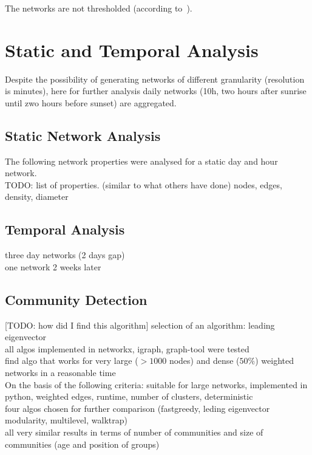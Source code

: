 The networks are not thresholded (according to~\cite{farine2015constructing}).

\section{Static and Temporal Analysis}

Despite the possibility of generating networks of different granularity (resolution is minutes), here for further analysis daily networks (10h, two hours after sunrise until zwo hours before sunset) are aggregated.

\subsection{Static Network Analysis}
The following network properties were analysed for a static day and hour network.\\
TODO: list of properties. (similar to what others have done)
nodes, edges, density, diameter\\


\subsection{Temporal Analysis}
three day networks (2 days gap)\\
one network 2 weeks later\\

\subsection{Community Detection}
[TODO: how did I find this algorithm]
selection of an algorithm: leading eigenvector~\cite{newman2006finding}\\
all algos implemented in networkx, igraph, graph-tool were tested\\
find algo that works for very large ($>1000$ nodes) and dense ($50\%$) weighted networks in a reasonable time\\
On the basis of the following criteria: suitable for large networks, implemented in python, weighted edges, runtime, number of clusters, deterministic\\
four algos chosen for further comparison (fastgreedy, leding eigenvector modularity, multilevel, walktrap)\\
all very similar results in terms of number of communities and size of communities (age and position of groups)\\

